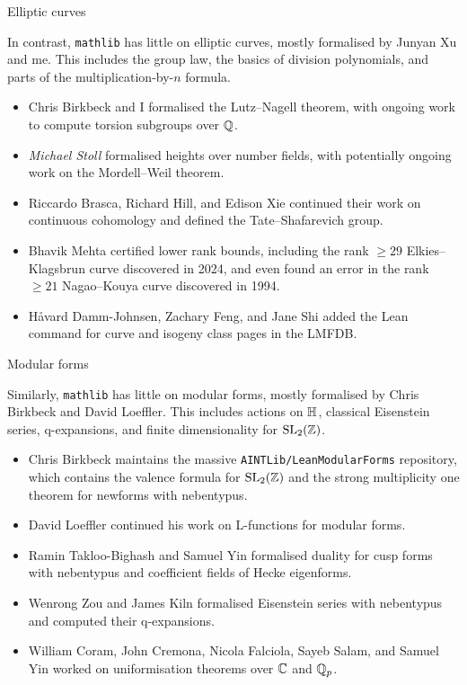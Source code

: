 \begin{frame}{Elliptic curves}

In contrast, \texttt{mathlib} has little on elliptic curves, mostly formalised by Junyan Xu and me. This includes the group law, the basics of division polynomials, and parts of the multiplication-by-$ n $ formula.
\begin{itemize}
\item Chris Birkbeck and I formalised the Lutz--Nagell theorem, with ongoing work to compute torsion subgroups over $ \mathbb{Q} $.
\item \emph{Michael Stoll} formalised heights over number fields, with potentially ongoing work on the Mordell--Weil theorem.
\item Riccardo Brasca, Richard Hill, and Edison Xie continued their work on continuous cohomology and defined the Tate--Shafarevich group.
\item Bhavik Mehta certified lower rank bounds, including the rank $ \ge29 $ Elkies--Klagsbrun curve discovered in 2024, and even found an error in the rank $ \ge21 $ Nagao--Kouya curve discovered in 1994.
\item Håvard Damm-Johnsen, Zachary Feng, and Jane Shi added the Lean command for curve and isogeny class pages in the LMFDB.
\end{itemize}

\end{frame}

\begin{frame}{Modular forms}

Similarly, \texttt{mathlib} has little on modular forms, mostly formalised by Chris Birkbeck and David Loeffler. This includes actions on $ \mathbb{H} $, classical Eisenstein series, q-expansions, and finite dimensionality for $ \operatorname{SL}_2(\mathbb{Z}) $.
\begin{itemize}
\item Chris Birkbeck maintains the massive \texttt{AINTLib/LeanModularForms} repository, which contains the valence formula for $ \operatorname{SL}_2(\mathbb{Z}) $ and the strong multiplicity one theorem for newforms with nebentypus.
\item David Loeffler continued his work on L-functions for modular forms.
\item Ramin Takloo-Bighash and Samuel Yin formalised duality for cusp forms with nebentypus and coefficient fields of Hecke eigenforms.
\item Wenrong Zou and James Kiln formalised Eisenstein series with nebentypus and computed their q-expansions.
\item William Coram, John Cremona, Nicola Falciola, Sayeb Salam, and Samuel Yin worked on uniformisation theorems over $ \mathbb{C} $ and $ \mathbb{Q}_p $.
\end{itemize}

\end{frame}

